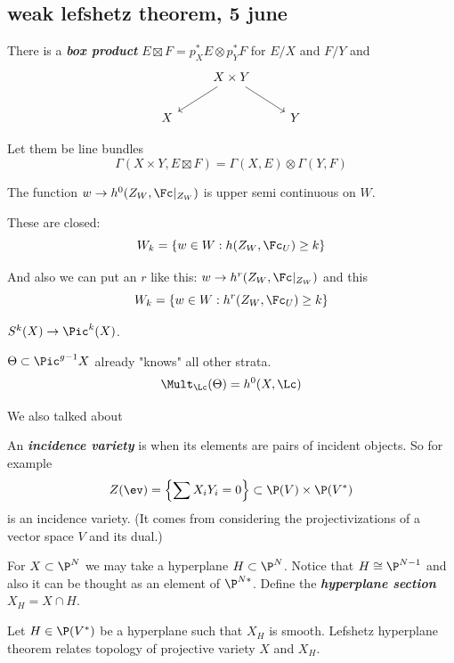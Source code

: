 \subsection{weak lefshetz theorem, 5 june}
There is a \textbf{\textit{box product}} $E\boxtimes F=p_X^*E\otimes p_Y^*F$ for $E/X$ and $F/Y$ and
\[\begin{tikzcd}
	&X\times Y\arrow[dl]\arrow[dr]\\
	X&&Y
\end{tikzcd}\]
\begin{thm}
	Let them be line bundles
	\[\Gamma(X\times Y,E\boxtimes F)=\Gamma(X,E)\otimes\Gamma(Y,F)\]
\end{thm}
\begin{thm}
	The function $w\to h^0(Z_W,\Fc|_{Z_W})$ is upper semi continuous on $W$.
	
	These are closed:
	\[W_k=\{w\in W:h(Z_W,\Fc_U)\geq k\}\]
	
	And also we can put an $r$ like this: $w\to h^r(Z_W,\Fc|_{Z_W})$ and this
		\[W_k=\{w\in W:h^r(Z_W,\Fc_U)\geq k\}\]
\end{thm}
\begin{example}
	$S^k(X)\to\Pic^k(X)$.
\end{example}
\begin{thm}[Riemann]
	$\Theta\subset\Pic^{g-1}X$ already "knows" all other strata.
	\[\Mult_{\Lc}(\Theta)=h^0(X,\Lc)\]
\end{thm}
We also talked about
\begin{defn}
	An \textbf{\textit{incidence variety}} is when its elements are pairs of incident objects. So for example
	\[Z(\ev)=\left\{\sum X_iY_i=0\right\}\subset\P(V)\times\P(V^*)\]
	is an incidence variety. (It comes from considering the projectivizations of a vector space $V$ and its dual.)
\end{defn}
For $X\subset \P^N$ we may take a hyperplane $H\subset\P^N$. Notice that $H\cong\P^{N-1}$ and also it can be thought as an element of $\P^{N*}$. Define the \textbf{\textit{hyperplane section}} $X_H=X\cap H$.

Let $H\in\P(V^*)$ be a hyperplane such that $X_H$ is smooth. Lefshetz hyperplane theorem relates topology of projective variety $X$ and $X_H$.

